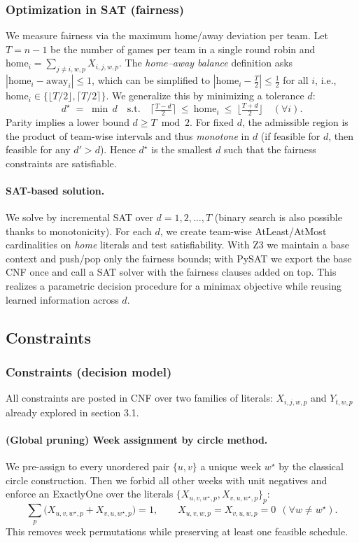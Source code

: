 \documentclass{article}
\begin{document}
\subsubsection*{Optimization in SAT (fairness)}
We measure fairness via the maximum home/away deviation per team. Let $T=n-1$ be the number of games per team in a single round robin and $\mathrm{home}_i=\sum_{j\neq i,w,p} X_{i,j,w,p}$. The \emph{home–away balance} definition \cite{knust2006balanced} asks $|\mathrm{home}_i-\mathrm{away}_i|\le1$, which can be simplified to $|\mathrm{home}_i-\tfrac{T}{2}|\le\tfrac12$ for all $i$, i.e., $\mathrm{home}_i\in\{\lfloor T/2\rfloor,\lceil T/2\rceil\}$. We generalize this by minimizing a tolerance $d$:
\[
d^\star \;=\; \min\, d \quad\text{s.t.}\quad
\Big\lceil \tfrac{T-d}{2} \Big\rceil \ \le\ \mathrm{home}_i\ \le\ \Big\lfloor \tfrac{T+d}{2} \Big\rfloor\quad(\forall i).
\]
Parity implies a lower bound $d\ge T\bmod 2$. For fixed $d$, the admissible region is the product of team-wise intervals and thus \emph{monotone} in $d$ (if feasible for $d$, then feasible for any $d'\!>\!d$). Hence $d^\star$ is the smallest $d$ such that the fairness constraints are satisfiable.

\paragraph{SAT-based solution.}
We solve by incremental SAT over $d=1,2,\dots,T$ (binary search is also possible thanks to monotonicity). For each $d$, we create team-wise AtLeast/AtMost cardinalities on \emph{home} literals and test satisfiability. With Z3 we maintain a base context and push/pop only the fairness bounds; with PySAT we export the base CNF once and call a SAT solver with the fairness clauses added on top. This realizes a parametric decision procedure for a minimax objective while reusing learned information across $d$.


\subsection{Constraints}

\subsubsection*{Constraints (decision model)}
All constraints are posted in CNF over two families of literals:
$X_{i,j,w,p}$ and $Y_{t,w,p}$ already explored in section 3.1.

\paragraph{(Global pruning) Week assignment by circle method.}
We pre-assign to every unordered pair $\{u,v\}$ a unique week $w^\star$ by the classical
circle construction. Then we forbid all other weeks with unit negatives and enforce an
\textsf{ExactlyOne} over the literals $\{X_{u,v,w^\star,p},X_{v,u,w^\star,p}\}_{p}$:
\[
\sum_{p}\bigl(X_{u,v,w^\star,p}+X_{v,u,w^\star,p}\bigr)=1,\qquad
X_{u,v,w,p}=X_{v,u,w,p}=0\ \ (\forall w\neq w^\star).
\]
This removes week permutations while preserving at least one feasible schedule.
\end{document}

